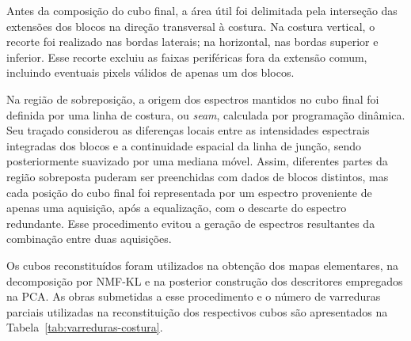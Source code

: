 Antes da composição do cubo final, a área útil foi delimitada pela interseção das extensões dos blocos na direção transversal à costura. Na costura vertical, o recorte foi realizado nas bordas laterais; na horizontal, nas bordas superior e inferior. Esse recorte excluiu as faixas periféricas fora da extensão comum, incluindo eventuais pixels válidos de apenas um dos blocos.

Na região de sobreposição, a origem dos espectros mantidos no cubo final foi definida por uma linha de costura, ou \textit{seam}, calculada por programação dinâmica. Seu traçado considerou as diferenças locais entre as intensidades espectrais integradas dos blocos e a continuidade espacial da linha de junção, sendo posteriormente suavizado por uma mediana móvel. Assim, diferentes partes da região sobreposta puderam ser preenchidas com dados de blocos distintos, mas cada posição do cubo final foi representada por um espectro proveniente de apenas uma aquisição, após a equalização, com o descarte do espectro redundante. Esse procedimento evitou a geração de espectros resultantes da combinação entre duas aquisições.

Os cubos reconstituídos foram utilizados na obtenção dos mapas elementares, na decomposição por NMF-KL e na posterior construção dos descritores empregados na PCA. As obras submetidas a esse procedimento e o número de varreduras parciais utilizadas na reconstituição dos respectivos cubos são apresentados na Tabela~\ref{tab:varreduras-costura}.

